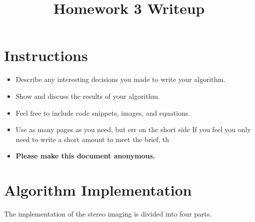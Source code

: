 \date{}

\title{\vspace{-1cm}Homework 3 Writeup}



\maketitle
\vspace{-3cm}
\thispagestyle{fancy}

\section*{Instructions}
\begin{itemize}
  \item Describe any interesting decisions you made to write your algorithm.
  \item Show and discuss the results of your algorithm.
  \item Feel free to include code snippets, images, and equations.
  \item Use as many pages as you need, but err on the short side If you feel you only need to write a short amount to meet the brief, th
  
  \item \textbf{Please make this document anonymous.}
\end{itemize}

\section*{Algorithm Implementation}

The implementation of the stereo imaging is divided into four parts.
